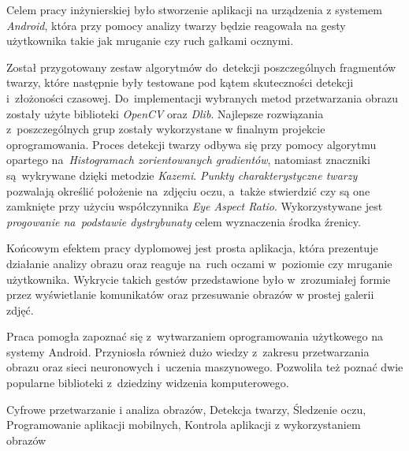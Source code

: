  \cleardoublepage %
 \streszczenie
 
 Celem pracy inżynierskiej było stworzenie aplikacji na urządzenia z systemem \textit{Android}, która przy pomocy analizy twarzy będzie reagowała na gesty użytkownika takie jak mruganie czy ruch gałkami ocznymi.
 
 \par
 
 Został przygotowany zestaw algorytmów do~detekcji poszczególnych fragmentów twarzy, które następnie były testowane pod kątem skuteczności detekcji i~złożoności czasowej. Do~implementacji wybranych metod przetwarzania obrazu zostały użyte biblioteki \textit{OpenCV} oraz \textit{Dlib}.
 Najlepsze rozwiązania z~poszczególnych grup zostały wykorzystane w finalnym projekcie oprogramowania. Proces detekcji twarzy odbywa się przy pomocy algorytmu opartego na~\textit{Histogramach zorientowanych gradientów}, natomiast znaczniki są~wykrywane dzięki metodzie \textit{Kazemi}. \textit{Punkty charakterystyczne twarzy} pozwalają określić położenie na~zdjęciu oczu, a~także stwierdzić czy są one zamknięte przy użyciu współczynnika \textit{Eye Aspect Ratio}. Wykorzystywane jest \textit{progowanie na~podstawie dystrybunaty} celem wyznaczenia środka źrenicy.
 
 \par
 
 Końcowym efektem pracy dyplomowej jest prosta aplikacja, która prezentuje działanie analizy obrazu oraz reaguje na~ruch oczami w~poziomie czy mruganie użytkownika. Wykrycie takich gestów przedstawione było w~zrozumiałej formie przez wyświetlanie komunikatów oraz przesuwanie obrazów w prostej galerii zdjęć. 
 
 \par
 
 Praca pomogła zapoznać się z~wytwarzaniem oprogramowania użytkowego na systemy Android. Przyniosła również dużo wiedzy z~zakresu przetwarzania obrazu oraz sieci neuronowych i~uczenia maszynowego. Pozwoliła też poznać dwie popularne biblioteki z~dziedziny widzenia komputerowego. 

 \slowakluczowe Cyfrowe przetwarzanie i analiza obrazów, Detekcja twarzy, Śledzenie oczu, Programowanie aplikacji mobilnych, Kontrola aplikacji z wykorzystaniem obrazów